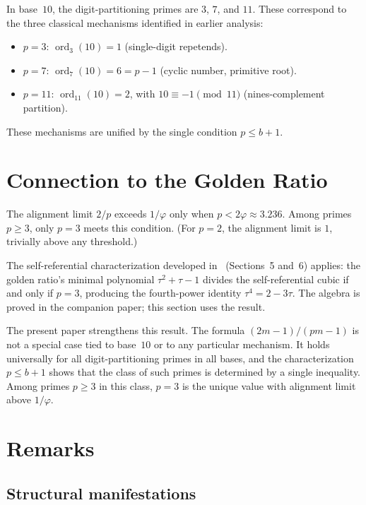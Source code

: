 \documentclass[12pt]{amsart}
\theoremstyle{definition}
\theoremstyle{remark}
\begin{document}
In base~$10$, the digit-partitioning primes are $3$, $7$, and $11$.
These correspond to the three classical mechanisms identified in
earlier analysis:
\begin{itemize}
\item $p = 3$: $\operatorname{ord}_{3}(10) = 1$ (single-digit
      repetends).
\item $p = 7$: $\operatorname{ord}_{7}(10) = 6 = p{-}1$ (cyclic
      number, primitive root).
\item $p = 11$: $\operatorname{ord}_{11}(10) = 2$, with
      $10 \equiv -1 \pmod{11}$ (nines-complement partition).
\end{itemize}

These mechanisms are unified by the single condition
$p \le b + 1$.

\section{Connection to the Golden Ratio}

The alignment limit $2/p$ exceeds $1/\varphi$ only when
$p < 2\varphi \approx 3.236$. Among primes $p \ge 3$,
only $p = 3$ meets this condition. (For $p = 2$, the
alignment limit is $1$, trivially above any threshold.)

The self-referential characterization developed
in~\cite{paper1} (Sections~5 and~6) applies: the
golden ratio's minimal polynomial
$\tau^{2} + \tau - 1$ divides the self-referential cubic
if and only if $p = 3$, producing the fourth-power
identity $\tau^{4} = 2 - 3\tau$. The algebra is proved
in the companion paper; this section uses the result.

The present paper strengthens this result. The formula
$(2m{-}1)/(pm{-}1)$ is not a special case tied to base~$10$ or to any
particular mechanism. It holds universally for all digit-partitioning
primes in all bases, and the characterization $p \le b + 1$ shows
that the class of such primes is determined by a single inequality.
Among primes $p \ge 3$ in this class, $p = 3$ is the
unique value with alignment limit above $1/\varphi$.

\section{Remarks}

\subsection*{Structural manifestations}
\end{document}
